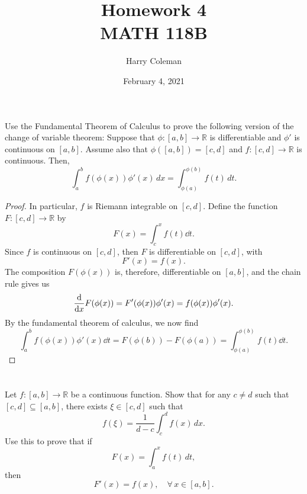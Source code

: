 \documentclass[12pt]{article}
\title{Homework 4\\
    \large MATH 118B
}
\author{Harry Coleman}
\date{February 4, 2021}
\newenvironment{problem}
    {\begin{lrbox}{\mybox}\begin{minipage}{0.98\textwidth}}
    {\end{minipage}\end{lrbox}\begin{center}\framebox[\textwidth]{\usebox{\mybox}}\end{center}}
\theoremstyle{definition}
\newcommand{\R}{\mathbb{R}}
\begin{document}
\maketitle

\section{}
\begin{problem}
    Use the Fundamental Theorem of Calculus to prove the following version of the change of variable theorem: Suppose that $\phi:[a,b]\to \R$ is differentiable and $\phi'$ is continuous on $[a,b]$. Assume also that $\phi([a,b]) = [c,d]$ and $f:[c,d]\to \R$ is continuous. Then,
    \begin{equation}
    \int_a^b f(\phi(x))\phi'(x)\,dx = \int_{\phi(a)}^{\phi(b)}f(t)\,dt.
    \end{equation}
\end{problem}

\begin{proof}
    In particular, $f$ is Riemann integrable on $[c, d]$. Define the function $F : [c, d] \to \R$ by
    \[
        F(x) = \int_c^x f(t) \dd{t}.
    \]
    Since $f$ is continuous on $[c, d]$, then $F$ is differentiable on $[c, d]$, with
    \[
        F'(x) = f(x).
    \]
    The composition $F(\phi(x))$ is, therefore, differentiable on $[a, b]$, and the chain rule gives us
    \[
        \dv{x} F(\phi(x)) = F'(\phi(x))\phi'(x) = f(\phi(x))\phi'(x).
    \]
    By the fundamental theorem of calculus, we now find
    \[
        \int_a^b f(\phi(x))\phi'(x) \dd{t} = F(\phi(b)) - F(\phi(a)) = \int_{\phi(a)}^{\phi(b)} f(t) \dd{t}.
    \]
    
\end{proof}

\newpage
\section{}
\begin{problem}
    Let $f:[a,b]\to \R$ be a continuous function. Show that for any $c\ne d$ such that $[c,d] \subseteq [a,b]$, there exists $\xi \in [c,d]$ such that 
    \begin{equation}
    f(\xi) = \frac{1}{d-c} \int_c^d f(x)\,dx.
    \end{equation}
    Use this to prove that if 
    \begin{equation}
    F(x) = \int_a^x f(t)\,dt,
    \end{equation}
    then 
    \begin{equation}
    F'(x) = f(x),\quad \forall\, x\in [a,b].
    \end{equation}
\end{problem}
\end{document}
